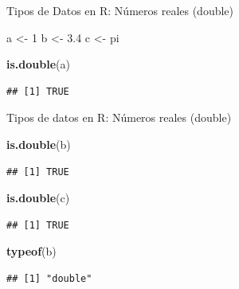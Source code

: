 \documentclass[ignorenonframetext,]{beamer}
\newenvironment{Shaded}{\begin{snugshade}}{\end{snugshade}}
\newcommand{\KeywordTok}[1]{\textcolor[rgb]{0.13,0.29,0.53}{\textbf{#1}}}
\newcommand{\DecValTok}[1]{\textcolor[rgb]{0.00,0.00,0.81}{#1}}
\newcommand{\FloatTok}[1]{\textcolor[rgb]{0.00,0.00,0.81}{#1}}
\newcommand{\StringTok}[1]{\textcolor[rgb]{0.31,0.60,0.02}{#1}}
\newcommand{\NormalTok}[1]{#1}
\begin{document}
\begin{frame}[fragile]{Tipos de Datos en R: Números reales (double)}

\begin{Shaded}
\begin{Highlighting}[]
\NormalTok{a <-}\StringTok{ }\DecValTok{1}
\NormalTok{b <-}\StringTok{ }\FloatTok{3.4}
\NormalTok{c <-}\StringTok{ }\NormalTok{pi}
\end{Highlighting}
\end{Shaded}

\begin{Shaded}
\begin{Highlighting}[]
\KeywordTok{is.double}\NormalTok{(a)}
\end{Highlighting}
\end{Shaded}

\begin{verbatim}
## [1] TRUE
\end{verbatim}

\end{frame}

\begin{frame}[fragile]{Tipos de datos en R: Números reales (double)}

\begin{Shaded}
\begin{Highlighting}[]
\KeywordTok{is.double}\NormalTok{(b)}
\end{Highlighting}
\end{Shaded}

\begin{verbatim}
## [1] TRUE
\end{verbatim}

\begin{Shaded}
\begin{Highlighting}[]
\KeywordTok{is.double}\NormalTok{(c)}
\end{Highlighting}
\end{Shaded}

\begin{verbatim}
## [1] TRUE
\end{verbatim}

\begin{Shaded}
\begin{Highlighting}[]
\KeywordTok{typeof}\NormalTok{(b)}
\end{Highlighting}
\end{Shaded}

\begin{verbatim}
## [1] "double"
\end{verbatim}

\end{frame}
\end{document}
